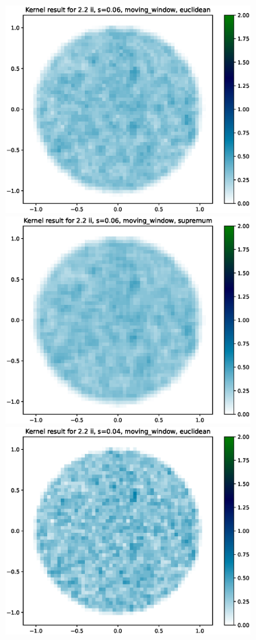 \documentclass{article}
\begin{document}
\hspace*{-1.5cm}\includegraphics[height=8cm]{comparisons//Kernel_result_2-2ii_s_0-06_moving_window_euclidean.eps} \hspace*{-1.5cm}
\includegraphics[height=8cm]{comparisons//Kernel_result_2-2ii_s_0-06_moving_window_supremum.eps} \\
\hspace*{-1.5cm}\includegraphics[height=8cm]{comparisons//Kernel_result_2-2ii_s_0-04_moving_window_euclidean.eps} \hspace*{-1.5cm}
\end{document}
